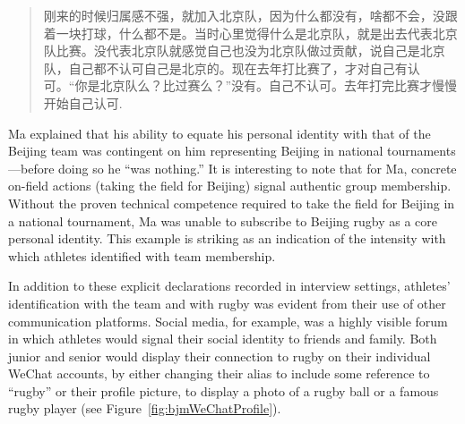 \begin{CJK}{UTF8}{gbsn}
    \begin{quote}
      刚来的时候归属感不强，就加入北京队，因为什么都没有，啥都不会，没跟着一块打球，什么都不是。当时心里觉得什么是北京队，就是出去代表北京队比赛。没代表北京队就感觉自己也没为北京队做过贡献，说自己是北京队，自己都不认可自己是北京的。现在去年打比赛了，才对自己有认可。“你是北京队么？比过赛么？”没有。自己不认可。去年打完比赛才慢慢开始自己认可.
    \end{quote}

Ma explained that his ability to equate his personal identity with that of the Beijing team was contingent on him representing Beijing in national tournaments---before doing so he ``was nothing.''  It is interesting to note that for Ma, concrete on-field actions (taking the field for Beijing) signal authentic group membership.  Without the proven technical competence required to take the field for Beijing in a national tournament, Ma was unable to subscribe to Beijing rugby as a core personal identity. This example is striking as an indication of the intensity with which athletes identified with team membership.

In addition to these explicit declarations recorded in interview settings, athletes' identification with the team and with rugby was evident from their use of other communication platforms.  Social media, for example, was a highly visible forum in which athletes would signal their social identity to friends and family.  Both junior and senior would display their connection to rugby on their individual WeChat accounts, by either changing their alias to include some reference to ``rugby'' or their profile picture, to display a photo of a rugby ball or a famous rugby player (see Figure~\ref{fig:bjmWeChatProfile}).


\end{CJK}

